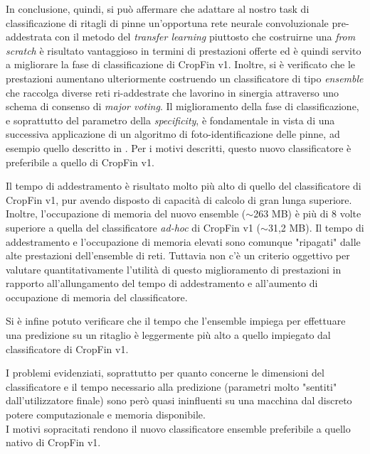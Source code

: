In conclusione, quindi, si può affermare che adattare al nostro task di classificazione di ritagli di pinne un'opportuna rete neurale convoluzionale pre-addestrata con il metodo del \textit{transfer learning} piuttosto che costruirne una \textit{from scratch} è risultato vantaggioso in termini di prestazioni offerte ed è quindi servito a migliorare la fase di classificazione di CropFin v1. Inoltre, si è verificato che le prestazioni aumentano ulteriormente costruendo un classificatore di tipo \textit{ensemble} che raccolga diverse reti ri-addestrate che lavorino in sinergia attraverso uno schema di consenso di \textit{major voting}.
Il miglioramento della fase di classificazione, e soprattutto del parametro della \textit{specificity}, è fondamentale in vista di una successiva applicazione di un algoritmo di foto-identificazione delle pinne, ad esempio quello descritto in \cite{emanuele}.
Per i motivi descritti, questo nuovo classificatore è preferibile a quello di CropFin v1.

Il tempo di addestramento è risultato molto più alto di quello del classificatore di CropFin v1, pur avendo disposto di capacità di calcolo di gran lunga superiore.
Inoltre, l'occupazione di memoria del nuovo ensemble ($\sim$263 MB) è più di 8 volte superiore a quella del classificatore \textit{ad-hoc} di CropFin v1 ($\sim$31,2 MB).
Il tempo di addestramento e l'occupazione di memoria elevati sono comunque "ripagati" dalle alte prestazioni dell'ensemble di reti.
Tuttavia non c'è un criterio oggettivo per valutare quantitativamente l'utilità di questo miglioramento di prestazioni in rapporto all'allungamento del tempo di addestramento e all'aumento di occupazione di memoria del classificatore.

Si è infine potuto verificare che il tempo che l'ensemble impiega per effettuare una predizione su un ritaglio è leggermente più alto a quello impiegato dal classificatore di CropFin v1.

I problemi evidenziati, soprattutto per quanto concerne le dimensioni del classificatore e il tempo necessario alla predizione (parametri molto "sentiti" dall'utilizzatore finale) sono però quasi ininfluenti su una macchina dal discreto potere computazionale e memoria disponibile.\\

\noindent I motivi sopracitati rendono il nuovo classificatore ensemble preferibile a quello nativo di CropFin v1.